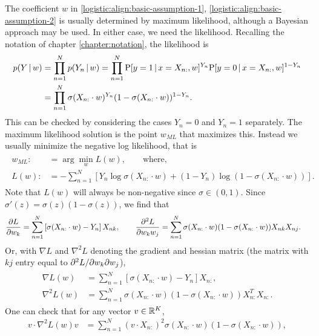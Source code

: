 The coefficient $w$ in \eqref{logistic:align:basic-assumption-1}, \eqref{logistic:align:basic-assumption-2} is usually determined by maximum likelihood, although a Bayesian approach may be used.  In either case, we need the likelihood.  Recalling the notation of chapter \ref{chapter:notation}, the likelihood is
\begin{align*}
  p(Y{\,|\,} w) &= \prod_{n=1}^N p(Y_n{\,|\,} w) = \prod_{n=1}^N \mathrm{P}[y=1{\,|\,} x=X_{n:}, w]^{Y_n}\mathrm{P}[y=0{\,|\,} x=X_{n:},w]^{1-Y_n}\\
  &= \prod_{n=1}^N \sigma(X_{n:}\cdot w)^{Y_n}(1-\sigma(X_{n:}\cdot w))^{1-Y_n}.
\end{align*}
This can be checked by considering the cases $Y_n=0$ and $Y_n=1$ separately.  The maximum likelihood solution is the point $w_{ML}$ that maximizes this.  Instead we usually minimize the negative log likelihood, that is
\begin{align}
  \label{logistic:align:ML-soln}
  \begin{split}
    w_{ML} :&= \arg\min_w L(w),\qquad\mbox{where,}\\
    L(w) :&= -\sum_{n=1}^N\left[ Y_n\log\sigma(X_{n:}\cdot w) + (1-Y_n)\log(1-\sigma(X_{n:}\cdot w)) \right].
  \end{split}
\end{align}
Note that $L(w)$ will always be non-negative since $\sigma\in(0, 1)$.
Since $\sigma'(z) = \sigma(z)(1-\sigma(z))$, we find that
\begin{align*}
  \frac{\partial L}{\partial w_k} &= \sum_{n=1}^N\left[ \sigma(X_{n:}\cdot w) - Y_n \right]X_{nk},\qquad
  \frac{\partial^2 L}{\partial w_k w_j} = \sum_{n=1}^N\sigma(X_{n:}\cdot w)(1 - \sigma(X_{n:}\cdot w)) X_{nk}X_{nj}.
\end{align*}
Or, with $\nabla L$ and $\nabla^2L$ denoting the gradient and hessian matrix (the matrix with $kj$ entry equal to $\partial^2L/\partial w_k\partial w_j$),
\begin{align}
  \label{logistic:align:grad-hess}
  \begin{split}
    \nabla L(w) &= \sum_{n=1}^N\left[ \sigma(X_{n:}\cdot w) - Y_n \right]X_{n:},\\
    \nabla^2L(w) &= \sum_{n=1}^N\sigma(X_{n:}\cdot w)(1 - \sigma(X_{n:}\cdot w)) X_{n:}^TX_{n:}.
  \end{split}
\end{align}
One can check that for any vector $v\in{\mathbb R}^K$,
\begin{align*}
  v\cdot\nabla^2L(w)v &= \sum_{n=1}^N(v\cdot X_{n:})^2\sigma(X_{n:}\cdot w)(1-\sigma(X_{n:}\cdot w)),
\end{align*}
